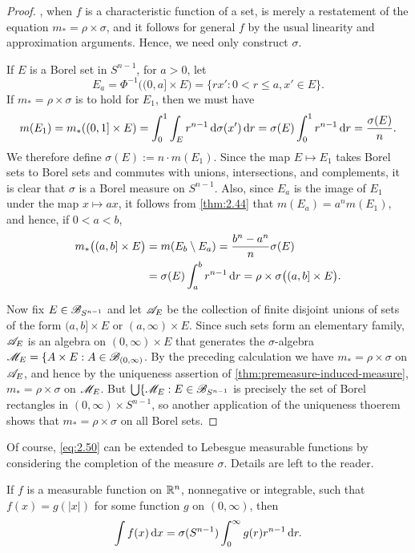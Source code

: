 \documentclass[12pt]{article} %
\begin{document}
\begin{proof}
    , when $f$ is a characteristic function of a set, is merely a restatement of the equation $m_* = \rho \times \sigma$, and it follows for general $f$ by the usual linearity and approximation arguments. Hence, we need only construct $\sigma$.

    If $E$ is a Borel set in $S^{n-1}$, for $a > 0$, let \[E_a = \Phi^{-1}\big((0, a] \times E \big) = \{rx' : 0 < r \leq a, x' \in E\}.\] If $m_* = \rho \times \sigma$ is to hold for $E_1$, then we must have \[m(E_1) = m_*((0, 1] \times E) = \int_0^1 \int_E r^{n-1} \, \mathrm{d} \sigma(x') \, \mathrm{d} r = \sigma(E) \int_0^1 r^{n-1} \, \mathrm{d} r = \frac{\sigma(E)}{n}.\] We therefore define $\sigma(E) := n \cdot m(E_1)$. Since the map $E \mapsto E_1$ takes Borel sets to Borel sets and commutes with unions, intersections, and complements, it is clear that $\sigma$ is a Borel measure on $S^{n-1}$. Also, since $E_a$ is the image of $E_1$ under the map $x \mapsto ax$, it follows from \cref{thm:2.44} that $m(E_a) = a^n m(E_1)$, and hence, if $0 < a < b$, \begin{align*}
        m_*\big( (a, b] \times E \big) &= m(E_b \setminus E_a) = \frac{b^n - a^n}{n} \sigma(E) \\
        &= \sigma(E) \int_a^b r^{n-1}\, \mathrm{d} r = \rho \times \sigma \big( (a,b] \times E \big).
    \end{align*}

    Now fix $E \in \mathscr{B}_{S^{n-1}}$ and let $\mathscr{A}_E$ be the collection of finite disjoint unions of sets of the form $(a, b] \times E$ or $(a, \infty) \times E$. Since such sets form an elementary family, $\mathscr{A}_E$ is an algebra on $(0, \infty) \times E$ that generates the $\sigma$-algebra $\mathscr{M}_E = \{A \times E : A \in \mathscr{B}_{(0, \infty)}$. By the preceding calculation we have $m_* = \rho \times \sigma$ on $\mathscr{A}_E$, and hence by the uniqueness assertion of \cref{thm:premeasure-induced-measure}, $m_* = \rho \times \sigma$ on $\mathscr{M}_E$. But $\bigcup \{\mathscr{M}_E : E \in \mathscr{B}_{S^{n-1}}$ is precisely the set of Borel rectangles in $(0, \infty) \times S^{n-1}$, so another application of the uniqueness thoerem shows that $m_* = \rho \times \sigma$ on all Borel sets.
\end{proof}

\noindent Of course, \cref{eq:2.50} can be extended to Lebesgue measurable functions by considering the completion of the measure $\sigma$. Details are left to the reader.

\begin{corollary}\label{cor:2.51}
    If $f$ is a measurable function on $\mathbb{R}^n$, nonnegative or integrable, such that $f(x) = g(|x|)$ for some function $g$ on $(0, \infty)$, then \[\int f(x) \, \mathrm{d} x = \sigma(S^{n-1}) \int_0^\infty g(r) r^{n-1}\, \mathrm{d} r.\]
\end{corollary}
\end{document}
